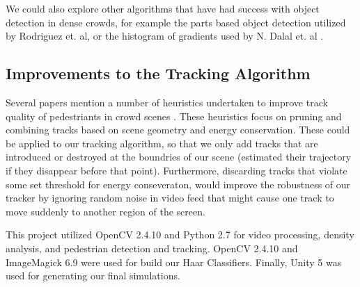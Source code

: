 \documentclass[12pt, onecolumn, conference]{IEEEtran}
\begin{document}
We could also explore other algorithms that have had success with object detection in dense crowds, for example the parts based object detection utilized by Rodriguez et. al, or the histogram of gradients used by N. Dalal et. al \cite{M. Rodriguez}\cite{N. Dalal}.

\subsection{Improvements to the Tracking Algorithm}
Several papers mention a number of heuristics undertaken to improve track quality of pedestriants in crowd scenes \cite{M. Rodriguez}\cite{D. Zhang}. These heuristics focus on pruning and combining tracks based on scene geometry and energy conservation. These could be applied to our tracking algorithm, so that we only add tracks that are introduced or destroyed at the boundries of our scene (estimated their trajectory if they disappear before that point). Furthermore, discarding tracks that violate some set threshold for energy conseveraton, would improve the robustness of our tracker by ignoring random noise in video feed that might cause one track to move suddenly to another region of the screen.

This project utilized OpenCV 2.4.10 and Python 2.7 for video processing, density analysis, and pedestrian detection and tracking. OpenCV 2.4.10 and ImageMagick 6.9 were used for build our Haar Classifiers. Finally, Unity 5 was used for generating our final simulations. 
\end{document}

